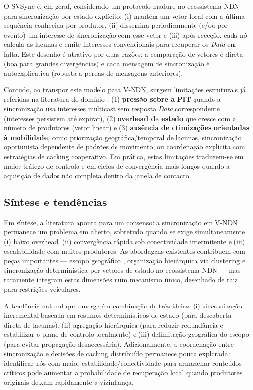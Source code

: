 O \gls{SVSync} é, em geral, considerado um protocolo maduro no ecossistema \gls{NDN} para sincronização por estado explícito: (i) mantém um vetor local com a última sequência conhecida por produtor, (ii) dissemina periodicamente (e/ou por evento) um interesse de sincronização com esse vetor e (iii) após receção, cada nó calcula as lacunas e emite interesses convencionais para recuperar os \textit{Data} em falta. Este desenho é atrativo por duas razões: a comparação de vetores é direta (boa para grandes divergências) e cada mensagem de sincronização é autoexplicativa (robusta a perdas de mensagens anteriores).

Contudo, ao transpor este modelo para \gls{V-NDN}, surgem limitações estruturais já referidas na literatura do domínio \cite{moll_sok_2022}: (1) \textbf{pressão sobre a \gls{PIT}} quando a sincronização usa interesses multicast sem resposta \textit{Data} correspondente (interesses persistem até expirar), (2) \textbf{overhead de estado} que cresce com o número de produtores (vetor linear) e (3) \textbf{ausência de otimizações orientadas à mobilidade}, como priorização geográfica/temporal de lacunas, sincronização oportunista dependente de padrões de movimento, ou coordenação explícita com estratégias de caching cooperativo. Em prática, estas limitações traduzem-se em maior tráfego de controlo e em ciclos de convergência mais longos quando a aquisição de dados não completa dentro da janela de contacto.

\subsection{Síntese e tendências}

Em síntese, a literatura aponta para um consenso: a sincronização em \gls{V-NDN} permanece um problema em aberto, sobretudo quando se exige simultaneamente (i) baixo overhead, (ii) convergência rápida sob conectividade intermitente e (iii) escalabilidade com muitos produtores. As abordagens existentes contribuem com peças importantes — escopo geográfico \cite{pereira_vehicular-ndn_2026}, organização hierárquica via clustering \cite{sampath_position-based_2021,de_castro_dynamic_2015,ayyub_comprehensive_2022} e sincronização determinística por vetores de estado no ecossistema \gls{NDN} \cite{moll_sok_2022} — mas raramente integram estas dimensões num mecanismo único, desenhado de raiz para restrições veiculares.

A tendência natural que emerge é a combinação de três ideias: (i) sincronização incremental baseada em resumos determinísticos de estado (para descoberta direta de lacunas), (ii) agregação hierárquica (para reduzir redundância e estabilizar o plano de controlo localmente) e (iii) delimitação geográfica do escopo (para evitar propagação desnecessária). Adicionalmente, a coordenação entre sincronização e decisões de caching distribuído permanece pouco explorada: identificar nós com maior estabilidade/conectividade para armazenar conteúdos críticos pode aumentar a probabilidade de recuperação local quando produtores originais deixam rapidamente a vizinhança.

